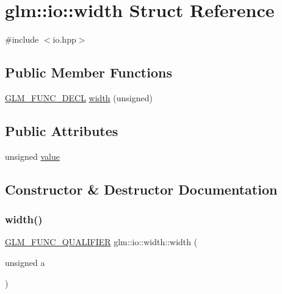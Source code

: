 \hypertarget{structglm_1_1io_1_1width}{}\section{glm\+:\+:io\+:\+:width Struct Reference}
\label{structglm_1_1io_1_1width}


{\ttfamily \#include $<$io.\+hpp$>$}

\subsection*{Public Member Functions}
\begin{DoxyCompactItemize}
\item 
\hyperlink{setup_8hpp_ab2d052de21a70539923e9bcbf6e83a51}{G\+L\+M\+\_\+\+F\+U\+N\+C\+\_\+\+D\+E\+CL} \hyperlink{structglm_1_1io_1_1width_a1576674b7e08dc5014ce4f41ac6eea5b}{width} (unsigned)
\end{DoxyCompactItemize}
\subsection*{Public Attributes}
\begin{DoxyCompactItemize}
\item 
unsigned \hyperlink{structglm_1_1io_1_1width_a6bf1338eb947811d36ec93bd2e9b8425}{value}
\end{DoxyCompactItemize}


\subsection{Constructor \& Destructor Documentation}
\mbox{\label{structglm_1_1io_1_1width_a1576674b7e08dc5014ce4f41ac6eea5b}} 
\subsubsection{\texorpdfstring{width()}{width()}}
{\footnotesize\ttfamily \hyperlink{setup_8hpp_a33fdea6f91c5f834105f7415e2a64407}{G\+L\+M\+\_\+\+F\+U\+N\+C\+\_\+\+Q\+U\+A\+L\+I\+F\+I\+ER} glm\+::io\+::width\+::width (\begin{DoxyParamCaption}\item[{unsigned}]{a }\end{DoxyParamCaption})\hspace{0.3cm}{\ttfamily [explicit]}}



